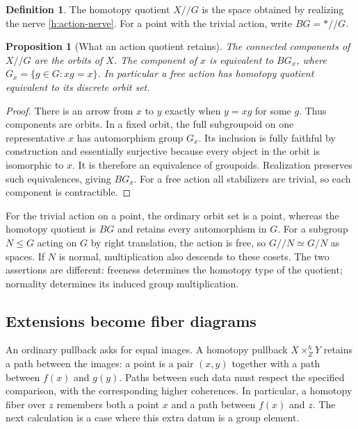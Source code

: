 \documentclass[11pt]{article}
\newtheorem{proposition}[theorem]{Proposition}
\theoremstyle{definition}
\newtheorem{definition}[theorem]{Definition}
\theoremstyle{remark}\newtheorem{remark}[theorem]{Remark}
\begin{document}
\begin{definition}\label{h:homotopy-quotient}
The homotopy quotient $X/\!/G$ is the space obtained by realizing the
nerve \eqref{h:action-nerve}.  For a point with the trivial action, write
$BG=*/\!/G$.
\end{definition}

\begin{proposition}[What an action quotient retains]\label{h:stabilizers}
The connected components of $X/\!/G$ are the orbits of $X$.  The component
of $x$ is equivalent to $BG_x$, where
$G_x=\{g\in G:xg=x\}$.  In particular a free action has homotopy quotient
equivalent to its discrete orbit set.
\end{proposition}
\begin{proof}
There is an arrow from $x$ to $y$ exactly when $y=xg$ for some $g$.
Thus components are orbits.  In a fixed orbit, the full subgroupoid on
one representative $x$ has automorphism group $G_x$.  Its inclusion is
fully faithful by construction and essentially surjective because every
object in the orbit is isomorphic to $x$.  It is therefore an equivalence
of groupoids.  Realization preserves such equivalences, giving $BG_x$.
For a free action all stabilizers are trivial, so each component is
contractible.
\end{proof}

For the trivial action on a point, the ordinary orbit set is a point,
whereas the homotopy quotient is $BG$ and retains every automorphism in
$G$.  For a subgroup $N\leq G$ acting on $G$ by right translation, the
action is free, so $G/\!/N\simeq G/N$ as spaces.  If $N$ is normal,
multiplication also descends to these cosets.  The two assertions are
different: freeness determines the homotopy type of the quotient;
normality determines its induced group multiplication.

\subsection{Extensions become fiber diagrams}

An ordinary pullback asks for equal images. A homotopy pullback
$X\times^h_ZY$ retains a path between the images: a point is a pair
$(x,y)$ together with a path between $f(x)$ and $g(y)$.
Paths between such data must respect the specified comparison, with the
corresponding higher coherences. In particular, a homotopy fiber over
$z$ remembers both a point $x$ and a path between $f(x)$ and $z$.
The next calculation is a case where this extra datum is a group element.
\end{document}
